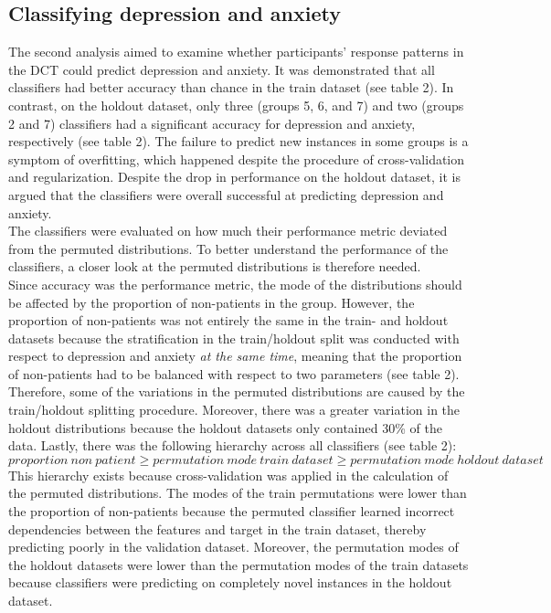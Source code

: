 \documentclass[11pt, a4paper]{article}
\begin{document}
\subsection{Classifying depression and anxiety}
The second analysis aimed to examine whether participants’ response patterns in the DCT could predict depression and anxiety. It was demonstrated that all classifiers had better accuracy than chance in the train dataset (see table 2). In contrast, on the holdout dataset, only three (groups 5, 6, and 7) and two (groups 2 and 7) classifiers had a significant accuracy for depression and anxiety, respectively (see table 2). The failure to predict new instances in some groups is a symptom of overfitting, which happened despite the procedure of cross-validation and regularization. Despite the drop in performance on the holdout dataset, it is argued that the classifiers were overall successful at predicting depression and anxiety. \\

The classifiers were evaluated on how much their performance metric deviated from the permuted distributions. To better understand the performance of the classifiers, a closer look at the permuted distributions is therefore needed. \\
Since accuracy was the performance metric, the mode of the distributions should be affected by the proportion of non-patients in the group. However, the proportion of non-patients was not entirely the same in the train- and holdout datasets because the stratification in the train/holdout split was conducted with respect to depression and anxiety \textit{at the same time}, meaning that the proportion of non-patients had to be balanced with respect to two parameters (see table 2). Therefore, some of the variations in the permuted distributions are caused by the train/holdout splitting procedure. Moreover, there was a greater variation in the holdout distributions because the holdout datasets only contained 30\% of the data. Lastly, there was the following hierarchy across all classifiers (see table 2): 
\[proportion \: non \: patient \geq permutation \: mode \: train \: dataset \geq permutation \: mode \: holdout \: dataset\]
This hierarchy exists because cross-validation was applied in the calculation of the permuted distributions. The modes of the train permutations were lower than the proportion of non-patients because the permuted classifier learned incorrect dependencies between the features and target in the train dataset, thereby predicting poorly in the validation dataset. Moreover, the permutation modes of the holdout datasets were lower than the permutation modes of the train datasets because classifiers were predicting on completely novel instances in the holdout dataset.\\
\end{document}
